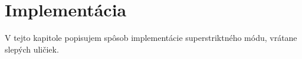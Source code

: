 \chapter{Implementácia}

\label{kap:implementacia} %

V tejto kapitole popisujem spôsob implementácie superstriktného módu, vrátane slepých uličiek.
